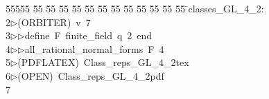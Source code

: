 %
%
\begin{tabbing}
55555 \= 55 \= 55 \= 55 \= 55 \= 55 \= 55 \= 55 \= 55 \= 55 \= 55 \= 55 \= 55 \= \>classes\_GL\_4\_2:\\[0pt]
2\>$\triangleright$\>(ORBITER)\ v\ 7\ \\[0pt]
3\>$\triangleright$\>$\triangleright$\>define\ F\ finite\_field\ q\ 2\ end\ \\[0pt]
4\>$\triangleright$\>$\triangleright$\>all\_rational\_normal\_forms\ F\ 4\ \\[0pt]
5\>$\triangleright$\>(PDFLATEX)\ Class\_reps\_GL\_4\_2tex\\[0pt]
6\>$\triangleright$\>(OPEN)\ Class\_reps\_GL\_4\_2pdf\\[0pt]
7\>\end{tabbing}
